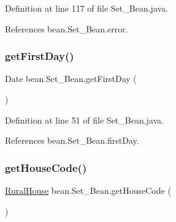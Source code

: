 Definition at line 117 of file Set\+\_\+\+Bean.\+java.


\begin{DoxyCode}{0}

\end{DoxyCode}


References bean.\+Set\+\_\+\+Bean.\+error.

\mbox{\label{classbean_1_1Set__Bean_a623256f1320812316c70b3b9bda4196c}} 
\subsubsection{\texorpdfstring{getFirstDay()}{getFirstDay()}}
{\footnotesize\ttfamily Date bean.\+Set\+\_\+\+Bean.\+get\+First\+Day (\begin{DoxyParamCaption}{ }\end{DoxyParamCaption})}



Definition at line 51 of file Set\+\_\+\+Bean.\+java.


\begin{DoxyCode}{0}

\end{DoxyCode}


References bean.\+Set\+\_\+\+Bean.\+first\+Day.

\mbox{\label{classbean_1_1Set__Bean_a317933af35c5e82b4ee1dd1883376773}} 
\subsubsection{\texorpdfstring{getHouseCode()}{getHouseCode()}}
{\footnotesize\ttfamily \mbox{\hyperlink{classdomain_1_1RuralHouse}{Rural\+House}} bean.\+Set\+\_\+\+Bean.\+get\+House\+Code (\begin{DoxyParamCaption}{ }\end{DoxyParamCaption})}



